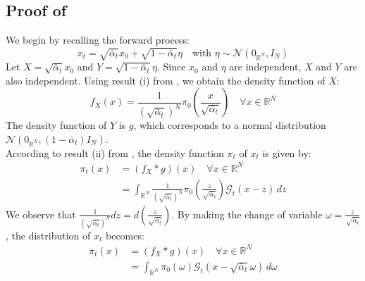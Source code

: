 \documentclass[a4paper,10pt]{article}
\theoremstyle{definition} %
\theoremstyle{definition} %
\theoremstyle{definition} %
\theoremstyle{definition} %
\newcommand{\R}{\mathbb{R}}
\newcommand{\E}[1]{\mathbb{E} \left[ {#1} \right] }
\newcommand{\0}{\boldsymbol{0}}
\begin{document}
\subsection{Proof of } \label{sec:proof_distribution_a_etap_t}
We begin by recalling the forward process:
\begin{equation*}
x_t = \sqrt{\bar{\alpha}_t} x_0 + \sqrt{1 - \bar{\alpha}_t} \eta \quad \text{with } \eta \sim \mathcal{N}(0_{\mathbb{R}^N}, I_N)
\end{equation*}
Let $X = \sqrt{\bar{\alpha}_t} x_0$ and $Y = \sqrt{1 - \bar{\alpha}_t} \eta$. Since $x_0$ and $\eta$ are independent, $X$ and $Y$ are also independent. Using result (i) from , we obtain the density function of $X$:
\begin{equation*}
f_X(x) = \frac{1}{(\sqrt{\bar{\alpha}_t})^N} \pi_0\left(\frac{x}{\sqrt{\bar{\alpha}_t}}\right) \quad \forall x \in \mathbb{R}^N
\end{equation*}
The density function of $Y$ is $g$, which corresponds to a normal distribution $\mathcal{N}(0_{\mathbb{R}^N}, (1 - \bar{\alpha}_t) I_N)$.
\\According to result (ii) from , the density function $\pi_t$ of $x_t$ is given by:
\begin{align*}
\pi_t(x) &= (f_X * g)(x) \quad \forall x \in \mathbb{R}^N \\
&= \int_{\mathbb{R}^N} \frac{1}{(\sqrt{\bar{\alpha}_t})^N} \pi_0\left(\frac{z}{\sqrt{\bar{\alpha}_t}}\right) \mathcal{G}_t(x - z) \, dz
\end{align*}
We observe that $\frac{1}{(\sqrt{\bar{\alpha}_t})^N} dz = d\left(\frac{z}{\sqrt{\bar{\alpha}_t}}\right)$. By making the change of variable $\omega = \frac{z}{\sqrt{\bar{\alpha}_t}}$, the distribution of $x_t$ becomes:
\begin{align*}
\pi_t(x) &= (f_X * g)(x) \quad \forall x \in \mathbb{R}^N \\
&= \int_{\mathbb{R}^N} \pi_0(\omega) \mathcal{G}_t(x - \sqrt{\bar{\alpha}_t} \omega) \, d\omega
\end{align*}

\end{document}
